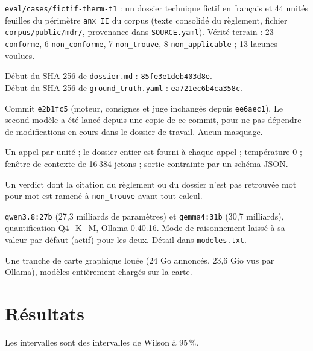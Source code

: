 \documentclass[11pt,a4paper]{article}
\begin{document}
\begin{description}[leftmargin=3.2cm,style=nextline]
\item[Cas] \texttt{eval/cases/fictif-therm-t1} : un dossier technique
  fictif en français et 44 unités feuilles du périmètre \texttt{anx\_II}
  du corpus (texte consolidé du règlement, fichier
  \texttt{corpus/public/mdr/}, provenance dans \texttt{SOURCE.yaml}).
  Vérité terrain : 23 \texttt{conforme}, 6 \texttt{non\_conforme},
  7 \texttt{non\_trouve}, 8 \texttt{non\_applicable} ; 13 lacunes voulues.
\item[Empreintes] Début du SHA-256 de \texttt{dossier.md} :
  \texttt{85fe3e1deb403d8e}.\\
  Début du SHA-256 de \texttt{ground\_truth.yaml} :
  \texttt{ea721ec6b4ca358c}.
\item[Code] Commit \texttt{e2b1fc5} (moteur, consignes et juge inchangés
  depuis \texttt{ee6aec1}). Le second modèle a été lancé depuis une copie
  de ce commit, pour ne pas dépendre de modifications en cours dans le
  dossier de travail. Aucun masquage.
\item[Appels] Un appel par unité ; le dossier entier est fourni à chaque
  appel ; température 0 ; fenêtre de contexte de 16\,384 jetons ; sortie
  contrainte par un schéma JSON.
\item[Règle de citation] Un verdict dont la citation du règlement ou du
  dossier n'est pas retrouvée mot pour mot est ramené à
  \texttt{non\_trouve} avant tout calcul.
\item[Modèles] \texttt{qwen3.8:27b} (27,3 milliards de paramètres) et
  \texttt{gemma4:31b} (30,7 milliards), quantification Q4\_K\_M,
  Ollama 0.40.16. Mode de raisonnement laissé à sa valeur par défaut
  (actif) pour les deux. Détail dans \texttt{modeles.txt}.
\item[Matériel] Une tranche de carte graphique louée (24 Go annoncés,
  23,6 Gio vus par Ollama), modèles entièrement chargés sur la carte.
\end{description}

\section{Résultats}

Les intervalles sont des intervalles de Wilson à 95\,\%.
\end{document}
